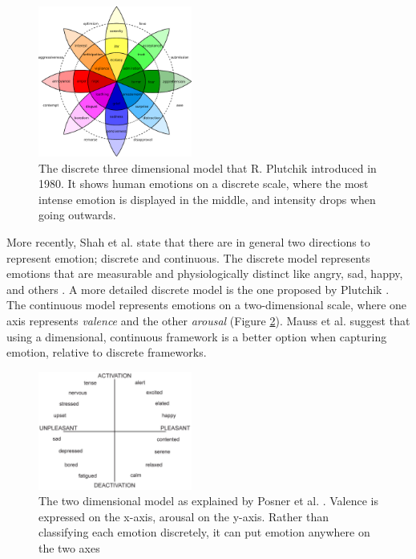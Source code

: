 \documentclass{sigchi}
\begin{document}
\begin{figure}[t]
    \centering
    \includegraphics[width=0.45\textwidth]{images/PlutchikWheelOfEmotions.eps}
    \caption{The discrete three dimensional model that R. Plutchik \protect\cite{Plutchik1980} introduced in 1980. It shows human emotions on a discrete scale, where the most intense emotion is displayed in the middle, and intensity drops when going outwards.}
    \label{fig:wheel_of_emotions}
\end{figure}

More recently, Shah et al. \cite{Shah2015} state that there are in general two directions to represent emotion; discrete and continuous. The discrete model represents emotions that are measurable and physiologically distinct like angry, sad, happy, and others \cite{Ekman1992}. A more detailed discrete model is the one proposed by Plutchik \cite{Plutchik1980}. The continuous model represents emotions on a two-dimensional scale, where one axis represents \textit{valence} and the other \textit{arousal} \cite{Posner2005} (Figure \ref{fig:circumplex_model}). Mauss et al. \cite{Mauss2009} suggest that using a dimensional, continuous framework is a better option when capturing emotion, relative to discrete frameworks. 

\begin{figure}[t]
    \centering
    \includegraphics[width=0.45\textwidth]{images/CircumplexModel.jpg}
    \caption{The two dimensional model as explained by Posner et al. \protect\cite{Posner2005}. Valence is expressed on the x-axis, arousal on the y-axis. Rather than classifying each emotion discretely, it can put emotion anywhere on the two axes}
    \label{fig:circumplex_model}
\end{figure}
\end{document}
